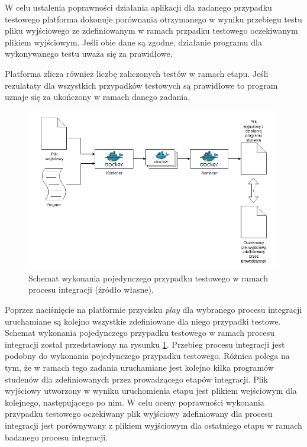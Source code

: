 W celu ustalenia poprawności działania aplikacji dla zadanego przypadku testowego platforma dokonuje porównania otrzymanego w wyniku przebiegu testu pliku wyjściowego ze zdefiniowanym w ramach przpadku testowego oczekiwanym plikiem wyjściowym.
Jeśli obie dane są zgodne, działanie programu dla wykonywanego testu uważa się za prawidłowe.

Platforma zlicza również liczbę zaliczonych testów w ramach etapu.
Jeśli rezulataty dla wszystkich przypadków testowych są prawidłowe to program uznaje się za ukończony w ramach danego zadania.

\begin{figure}[h]
    \centering
    \includegraphics[width = 12cm]{chapter05/integration.png}
    \caption{Schemat wykonania pojedynczego przypadku testowego w ramach procesu integracji (źródło własne).}
    \label{fig:integration}
\end{figure}

Poprzez naciśnięcie na platformie przycisku \textit{play} dla wybranego procesu integracji uruchamiane są kolejno wszystkie zdefiniowane dla niego przypadki testowe.
Schemat wykonania pojedynczego przypadku testowego w ramach procesu integracji został przedstawiony na rysunku \ref{fig:integration}.
Przebieg procesu integracji jest podobny do wykonania pojedynczego przypadku testowego.
Różnica polega na tym, że w ramach tego zadania uruchamiane jest kolejno kilka programów studenów dla zdefiniowanych przez prowadzącego etapów integracji.
Plik wyjściowy utworzony w wyniku uruchomienia etapu jest plikiem wejściowym dla kolejnego, następującego po nim.
W celu oceny poprawności wykonania przypadku testowego oczekiwany plik wyjściowy zdefiniowany dla procesu integracji jest porównywany z plikiem wyjściowym dla ostatniego etapu w ramach badanego procesu integracji.

